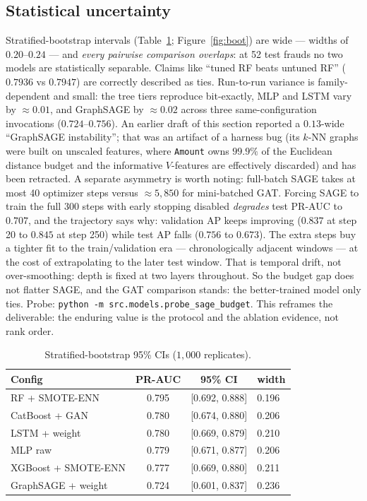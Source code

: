 \documentclass[11pt,a4paper]{article}
\newcommand{\code}[1]{\texttt{\small #1}}
\begin{document}
\subsection{Statistical uncertainty}\label{sec:boot}
Stratified-bootstrap intervals (Table~\ref{tab:boot}; Figure~\ref{fig:boot}) are wide ---
widths of $0.20$--$0.24$ --- and \emph{every pairwise comparison overlaps}: at 52 test frauds
no two models are statistically separable. Claims like ``tuned RF beats untuned RF''
($0.7936$ vs $0.7947$) are correctly described as ties. Run-to-run variance is family-dependent
and small: the tree tiers reproduce bit-exactly, MLP and LSTM vary by $\approx 0.01$, and
GraphSAGE by $\approx 0.02$ across three same-configuration invocations ($0.724$--$0.756$). An earlier
draft of this section reported a $0.13$-wide ``GraphSAGE instability''; that was an artifact of
a harness bug (its $k$-NN graphs were built on unscaled features, where \code{Amount} owns
$99.9\%$ of the Euclidean distance budget and the informative $V$-features are effectively
discarded) and has been retracted. A separate asymmetry is worth noting: full-batch SAGE takes
at most 40 optimizer steps versus $\approx 5{,}850$ for mini-batched GAT. Forcing SAGE to train
the full 300 steps with early stopping disabled \emph{degrades} test PR-AUC to $0.707$, and
the trajectory says why: validation AP keeps improving ($0.837$ at step 20 to $0.845$ at step
250) while test AP falls ($0.756$ to $0.673$). The extra steps buy a tighter fit to the
train/validation era --- chronologically adjacent windows --- at the cost of extrapolating to
the later test window. That is temporal drift, not over-smoothing: depth is fixed at two layers
throughout. So the budget gap does not flatter SAGE, and the GAT comparison stands: the
better-trained model only ties. Probe: \texttt{python -m src.models.probe\_sage\_budget}. This
reframes the deliverable: the enduring value is the protocol and the ablation evidence, not
rank order.

\begin{table}[h]
      \centering\small
      \caption{Stratified-bootstrap 95\% CIs ($1{,}000$ replicates).}
      \label{tab:boot}
      \begin{tabular}{lccl}
            \toprule
            Config & PR-AUC & 95\% CI & width\\
            \midrule
            RF + SMOTE-ENN & 0.795 & [0.692, 0.888] & 0.196\\
            CatBoost + GAN & 0.780 & [0.674, 0.880] & 0.206\\
            LSTM + weight & 0.780 & [0.669, 0.879] & 0.210\\
            MLP raw & 0.779 & [0.671, 0.877] & 0.206\\
            XGBoost + SMOTE-ENN & 0.777 & [0.669, 0.880] & 0.211\\
            GraphSAGE + weight & 0.724 & [0.601, 0.837] & 0.236\\
            \bottomrule
      \end{tabular}
\end{table}
\end{document}
